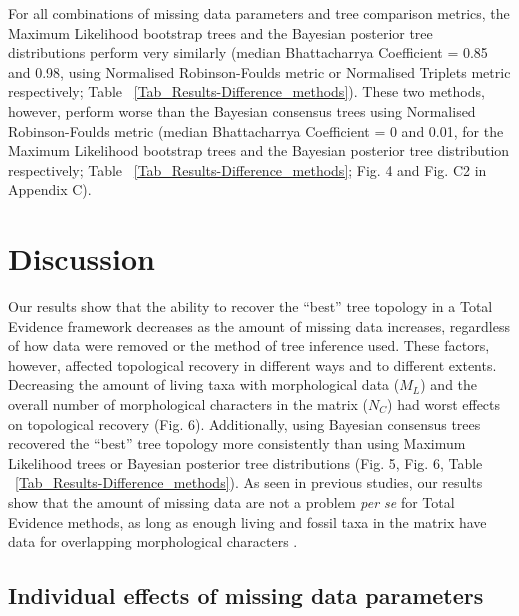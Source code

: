 \documentclass[12pt,letterpaper]{article}
\begin{document}
For all combinations of missing data parameters and tree comparison metrics, the Maximum Likelihood bootstrap trees and the Bayesian posterior tree distributions perform very similarly (median Bhattacharrya Coefficient = 0.85 and 0.98, using Normalised Robinson-Foulds metric or Normalised Triplets metric respectively; Table ~\ref{Tab_Results-Difference_methods}).
These two methods, however, perform worse than the Bayesian consensus trees using Normalised Robinson-Foulds metric (median Bhattacharrya Coefficient = 0 and 0.01, for the Maximum Likelihood bootstrap trees and the Bayesian posterior tree distribution respectively; Table ~\ref{Tab_Results-Difference_methods}; Fig. 4 and Fig. C2 in Appendix C).

%
%


\section{Discussion}

Our results show that the ability to recover the ``best'' tree topology in a Total Evidence framework decreases as the amount of missing data increases, regardless of how data were removed or the method of tree inference used.
These factors, however, affected topological recovery in different ways and to different extents.
Decreasing the amount of living taxa with morphological data ($M_{L}$) and the overall number of morphological characters in the matrix ($N_{C}$) had worst effects on topological recovery (Fig. 6).
Additionally, using Bayesian consensus trees recovered the ``best'' tree topology more consistently than using Maximum Likelihood trees or Bayesian posterior tree distributions (Fig. 5, Fig. 6, Table ~\ref{Tab_Results-Difference_methods}).
As seen in previous studies, our results show that the amount of missing data are not a problem \textit{per se} for Total Evidence methods, as long as enough living and fossil taxa in the matrix have data for overlapping morphological characters \citep[e.g.][]{kearneyfragmentary2002,wiensmissing2003,rouresite-specific2011,pattinsonphylogeny2014}.

\subsection{Individual effects of missing data parameters}
\end{document}
